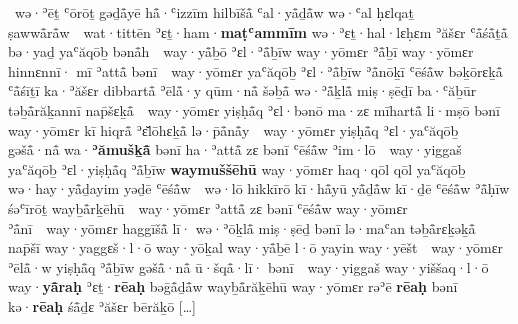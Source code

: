 \begin{Parallel}{0.425\textwidth}{0.545\textwidth}
{	~wə·ʾēṯ ʿōrōṯ gəḏå̄yē hå̄·ʿizzīm hilbīšå̄ ʿal·yå̄ḏå̄w wə·ʿal ḥɛlqaṯ ṣawwå̄rå̄w\ 
	~wat·tittēn ʾɛṯ·ham·\textbf{maṭʿammīm} wə·ʾɛṯ·hal·lɛḥɛm ʾăšɛr ʿå̄śå̄ṯå̄ bə·yaḏ yaʿăqōḇ bənå̄h\ 
	~way·yå̄ḇō ʾɛl·ʾå̄ḇīw way·yōmɛr ʾå̄ḇī way·yōmɛr hinnɛnnī· mī ʾattå̄ bənī\ 
	~way·yōmɛr yaʿăqōḇ ʾɛl·ʾå̄ḇīw ʾå̄nōḵī ʿēśå̄w bəḵōrɛḵå̄ ʿå̄śīṯī ka·ʾăšɛr dibbartå̄ ʾēlå̄·y qūm·nå̄ šəḇå̄ wə·ʾå̄ḵlå̄ miṣ·ṣēḏī ba·ʿăḇūr təḇå̄răḵannī nap̄šɛḵå̄\ 
	~way·yōmɛr yiṣḥå̄q ʾɛl·bənō ma·zɛ mīhartå̄ li·mṣō bənī way·yōmɛr kī hiqrå̄ {\YHWH} ʾɛ̆lōhɛḵå̄ lə·p̄å̄nå̄y\ 
	~way·yōmɛr yiṣḥå̄q ʾɛl·yaʿăqōḇ gəšå̄·nå̄ wa·\textbf{ʾămušḵå̄} bənī ha·ʾattå̄ zɛ bənī ʿēśå̄w ʾim·lō\ 
	~way·yiggaš yaʿăqōḇ ʾɛl·yiṣḥå̄q ʾå̄ḇīw \textbf{waymuššēhū} way·yōmɛr haq·qōl qōl yaʿăqōḇ wə·hay·yå̄ḏayim yəḏē ʿēśå̄w\ 
	~wə·lō hikkīrō kī·hå̄yū yå̄ḏå̄w kī·ḏē ʿēśå̄w ʾå̄ḥīw śəʿīrōṯ wayḇå̄rḵēhū\ 
	~way·yōmɛr ʾattå̄ zɛ bənī ʿēśå̄w way·yōmɛr ʾå̄nī\ 
	~way·yōmɛr haggīšå̄ lī· wə·ʾōḵlå̄ miṣ·ṣēḏ bənī lə·maʿan təḇå̄rɛḵəḵå̄ nap̄šī way·yaggɛš·l·ō way·yōḵal way·yå̄ḇē l·ō yayin way·yēšt\ 
	~way·yōmɛr ʾēlå̄·w yiṣḥå̄q ʾå̄ḇīw gəšå̄·nå̄ ū·šqå̄·lī· bənī\ 
	~way·yiggaš way·yiššaq·l·ō way·\textbf{yå̄raḥ} ʾɛṯ·\textbf{rēaḥ} bəḡå̄ḏå̄w wayḇå̄răḵēhū way·yōmɛr rəʾē \textbf{rēaḥ} bənī kə·\textbf{rēaḥ} śå̄ḏɛ ʾăšɛr bērăḵō {\YHWH}
	[…]
}
\end{Parallel}
